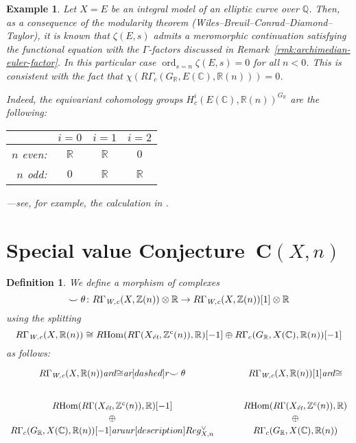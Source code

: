 \documentclass[10pt,a4paper,oneside]{article}
\DeclareMathOperator{\Hom}{Hom}
\DeclareMathOperator{\ord}{ord}
\newcommand{\CC}{\mathbb{C}}
\newcommand{\QQ}{\mathbb{Q}}
\newcommand{\RR}{\mathbb{R}}
\newcommand{\ZZ}{\mathbb{Z}}
\newcommand{\ar}{\text{\it ar}}
\newcommand{\et}{\text{\it \'{e}t}}
\newcommand{\Wc}{\text{\it W,c}}
\newcommand{\RHom}{R\!\Hom}
\theoremstyle{myplain}
\theoremstyle{mydefinition}
\newtheorem{definition}[theorem]{Definition}
\newtheorem{example}[theorem]{Example}
\numberwithin{equation}{section}
\begin{document}
\begin{example}
  Let $X = E$ be an integral model of an elliptic curve over $\QQ$. Then, as a
  consequence of the modularity theorem
  (Wiles--Breuil--Conrad--Diamond--Taylor), it is known that $\zeta (E,s)$
  admits a meromorphic continuation satisfying the functional equation with the
  $\Gamma$-factors discussed in Remark~\ref{rmk:archimedian-euler-factor}.
  In this particular case $\ord_{s=n} \zeta (E,s) = 0$ for all $n < 0$. This is
  consistent with the fact that
  $\chi (R\Gamma_c (G_\RR, E (\CC), \RR (n))) = 0$.

  Indeed, the equivariant cohomology groups $H^i_c (E (\CC), \RR (n))^{G_\RR}$
  are the following:
  \begin{center}
    \renewcommand{\arraystretch}{1.5}
    \begin{tabular}{rccc}
      \hline
      & $i = 0$ & $i = 1$ & $i = 2$ \\
      \hline
      $n$ even: & $\RR$ & $\RR$ & $0$ \\
      $n$ odd: & $0$ & $\RR$ & $\RR$ \\
      \hline
    \end{tabular}
  \end{center}
  ---see, for example, the calculation in \cite[Lemma~A.6]{Siebel-2019}.
\end{example}


\section{Special value Conjecture~$\mathbf{C} (X,n)$}
\label{sec:special-value-conjecture}

\begin{definition}
  We define a morphism of complexes
  \[ \smile\theta\colon R\Gamma_\Wc (X,\ZZ(n)) \otimes \RR \to
    R\Gamma_\Wc (X,\ZZ(n)) [1] \otimes \RR \]
  using the splitting \cite[Proposition~7.13]{Beshenov-Weil-etale-1}
  \[ R\Gamma_\Wc (X, \RR (n)) \cong
    \RHom (R\Gamma (X_\et, \ZZ^c (n)), \RR) [-1] \oplus
    R\Gamma_c (G_\RR, X (\CC), \RR (n)) [-1] \]
  as follows:
  \[ \begin{tikzcd}
      R\Gamma_\Wc (X, \RR(n)) \ar{d}{\cong}\ar[dashed]{r}{\smile\theta} & R\Gamma_\Wc (X, \RR(n)) [1]\ar{d}{\cong} \\
      \RHom (R\Gamma (X_\et, \ZZ^c (n)), \RR) [-1] & \RHom (R\Gamma (X_\et, \ZZ^c (n)), \RR) \\[-2em]
      \oplus & \oplus \\[-2em]
      R\Gamma_c (G_\RR, X (\CC), \RR (n)) [-1]\ar{uur}[description]{Reg_{X,n}^\vee} & R\Gamma_c (G_\RR, X (\CC), \RR (n))
    \end{tikzcd} \]
\end{definition}
\end{document}

